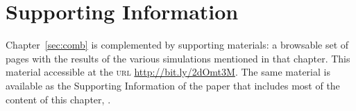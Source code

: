 \chapter{Supporting Information}
\label{sec:supplmat}
\setstretch{\lspac}

Chapter~\ref{sec:comb} is complemented by supporting materials: a browsable set of pages with the results of the various simulations mentioned in that chapter. This material accessible at the \textsc{url} \href{http://bit.ly/2dOmt3M}{http://bit.ly/2dOmt3M}. The same material is available as the Supporting Information of the paper that includes most of the content of this chapter, \citet{Winkler2016}.